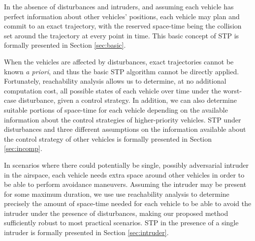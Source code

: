 In the absence of disturbances and intruders, and assuming each vehicle has perfect information about other vehicles' positions, each vehicle may plan and commit to an exact trajectory, with the reserved space-time being the collision set around the trajectory at every point in time. This basic concept of STP is formally presented in Section \ref{sec:basic}.

When the vehicles are affected by disturbances, exact trajectories cannot be known \textit{a priori}, and thus the basic STP algorithm cannot be directly applied. Fortunately, reachability analysis allows us to determine, at no additional computation cost, all possible states of each vehicle over time under the worst-case disturbance, given a control strategy. In addition, we can also determine suitable portions of space-time for each vehicle depending on the available information about the control strategies of higher-priority vehicles. STP under disturbances and three different assumptions on the information available about the control strategy of other vehicles is formally presented in Section \ref{sec:incomp}.

In scenarios where there could potentially be single, possibly adversarial intruder in the airspace, each vehicle needs extra space around other vehicles in order to be able to perform avoidance maneuvers. Assuming the intruder may be present for some maximum duration, we use use reachability analysis to determine precisely the amount of space-time needed for each vehicle to be able to avoid the intruder under the presence of disturbances, making our proposed method sufficiently robust to most practical scenarios. STP in the presence of a single intruder is formally presented in Section \ref{sec:intruder}.
